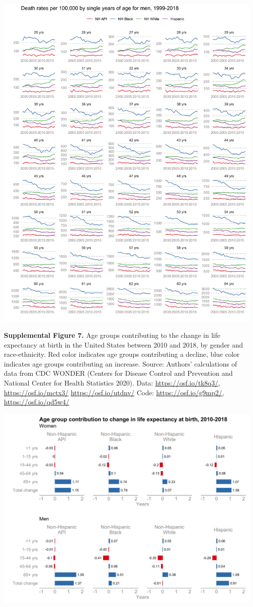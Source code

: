\documentclass[
  11pt,
]{article}
\begin{document}
\includegraphics[width=0.9\linewidth]{../figures/single-ages-men}

\newpage

\textbf{Supplemental Figure 7.} Age groups contributing to the change in
life expectancy at birth in the United States between 2010 and 2018, by
gender and race-ethnicity. Red color indicates age groups contributing a
decline, blue color indicates age groups contributing an increase.
Source: Authors' calculations of data from CDC WONDER (Centers for
Disease Control and Prevention and National Center for Health Statistics
2020). Data: \url{https://osf.io/tk8q3/}, \url{https://osf.io/mctx3/}
\url{https://osf.io/utdnv/} Code: \url{https://osf.io/g9mp2/},
\url{https://osf.io/qd5w4/}

\includegraphics[width=1\linewidth]{../figures/le-age-decomp-2010-2018}
\end{document}
